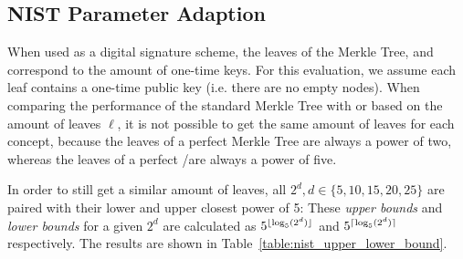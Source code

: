 \subsection{NIST Parameter Adaption}
\label{sec:nist_param_to_leaves}
When used as a digital signature scheme, the leaves of the Merkle Tree, \tftree and \extree correspond to the amount of one-time keys. For this evaluation, we assume each leaf contains a one-time public key (i.e. there are no empty nodes). When comparing the performance of the standard Merkle Tree with \tftree or \extree based on the amount of leaves $\ell$, it is not possible to get the same amount of leaves for each concept, because the leaves of a perfect Merkle Tree are always a power of two, whereas the leaves of a perfect \tftree\xspace/\xspace\extree are always a power of five. 
 
In order to still get a similar amount of leaves, all $2^d, d \in \{5,10,15,20,25\}$ are paired with their lower and upper closest power of 5:
These \textit{upper bounds} and \textit{lower bounds} for a given $2^d$ are calculated as $5^{\lfloor\log_5(2^d)\rfloor}$ and $5^{\lceil\log_5(2^d)\rceil}$ respectively. The results are shown in Table~\ref{table:nist_upper_lower_bound}. 

